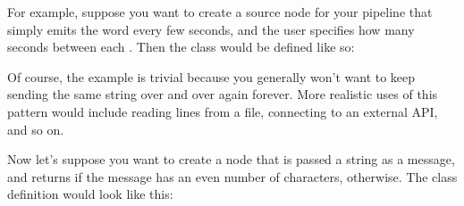 \documentclass[letterpaper,10pt,english]{sphinxmanual}
\begin{document}
For example, suppose you want to create a source node for your pipeline
that simply emits the word  every few seconds, and the user
specifies how many seconds between each . Then the class would be
defined like so:

%
\begin{sphinxVerbatim}[commandchars=\\\{\}]
   
       
          
          
           

     
         
               
\end{sphinxVerbatim}

Of course, the example is trivial because you generally won’t want to
keep sending the same string over and over again forever. More realistic
uses of this pattern would include reading lines from a file, connecting
to an external API, and so on.

Now let’s suppose you want to create a node that is passed a string as a
message, and returns  if the message has an even number of
characters,  otherwise. The class definition would look like
this:
\end{document}
